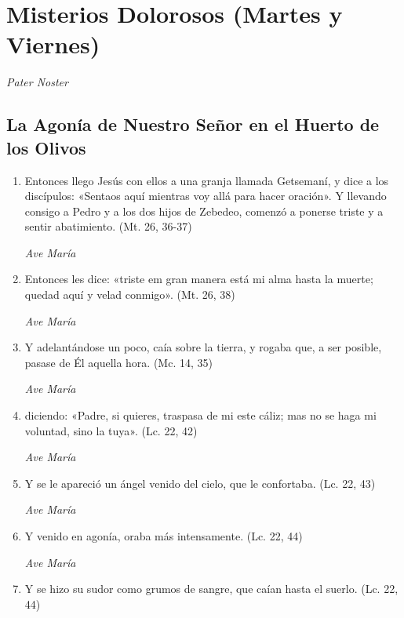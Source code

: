 \documentclass[a4paper,11pt, oneside]{report}
\begin{document}
    \section*{Misterios Dolorosos (Martes y Viernes)}
    
      \textit{Pater Noster}

      \subsection*{La Agonía de Nuestro Señor en el Huerto de los Olivos}
      
        \begin{enumerate}

          \item Entonces llego Jesús con ellos a una granja llamada Getsemaní, y dice a los discípulos: «Sentaos aquí mientras voy allá para hacer oración». 
          Y llevando consigo a Pedro y a los dos hijos de Zebedeo, comenzó a ponerse triste y a sentir abatimiento. (Mt. 26, 36-37)

          \textit{Ave María}

          \item Entonces les dice: «triste em gran manera está mi alma hasta la muerte; quedad aquí y velad conmigo». (Mt. 26, 38)

          \textit{Ave María}

          \item Y adelantándose un poco, caía sobre la tierra, y rogaba que, a ser posible, pasase de Él aquella hora. (Mc. 14, 35)

          \textit{Ave María}

          \item diciendo: «Padre, si quieres, traspasa de mi este cáliz; mas no se haga mi voluntad, sino la tuya». (Lc. 22, 42)

          \textit{Ave María}

          \item Y se le apareció un ángel venido del cielo, que le confortaba. (Lc. 22, 43)

          \textit{Ave María}

          \item Y venido en agonía, oraba más intensamente. (Lc. 22, 44)

          \textit{Ave María}

          \item Y se hizo su sudor como grumos de sangre, que caían hasta el suerlo. (Lc. 22, 44)


\end{enumerate}
\end{document}
